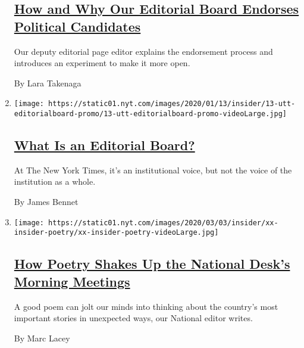 \begin{enumerate}
  \hypertarget{how-and-why-our-editorial-board-endorses-political-candidates}{%
  \subsection{\texorpdfstring{\href{/2020/01/13/reader-center/political-endorsements.html}{How
  and Why Our Editorial Board Endorses Political
  Candidates}}{How and Why Our Editorial Board Endorses Political Candidates}}\label{how-and-why-our-editorial-board-endorses-political-candidates}}

  Our deputy editorial page editor explains the endorsement process and
  introduces an experiment to make it more open.

  By Lara Takenaga
\item
  \texttt{[image: https://static01.nyt.com/images/2020/01/13/insider/13-utt-editorialboard-promo/13-utt-editorialboard-promo-videoLarge.jpg]}

  \hypertarget{what-is-an-editorial-board}{%
  \subsection{\texorpdfstring{\href{/2020/01/13/reader-center/editorial-board-explainer.html}{What
  Is an Editorial
  Board?}}{What Is an Editorial Board?}}\label{what-is-an-editorial-board}}

  At The New York Times, it's an institutional voice, but not the voice
  of the institution as a whole.

  By James Bennet
\item
  \texttt{[image: https://static01.nyt.com/images/2020/03/03/insider/xx-insider-poetry/xx-insider-poetry-videoLarge.jpg]}

  \hypertarget{how-poetry-shakes-up-the-national-desks-morning-meetings}{%
  \subsection{\texorpdfstring{\href{/2020/03/05/reader-center/poetry-national-news.html}{How
  Poetry Shakes Up the National Desk's Morning
  Meetings}}{How Poetry Shakes Up the National Desk's Morning Meetings}}\label{how-poetry-shakes-up-the-national-desks-morning-meetings}}

  A good poem can jolt our minds into thinking about the country's most
  important stories in unexpected ways, our National editor writes.

  By Marc Lacey
\end{enumerate}

